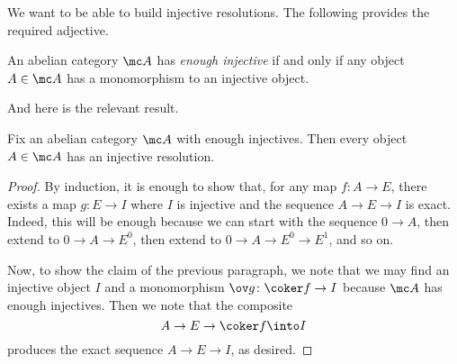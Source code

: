 \documentclass[../notes.tex]{subfiles}
\begin{document}
We want to be able to build injective resolutions. The following provides the required adjective.
\begin{definition}
	An abelian category $\mc A$ has \textit{enough injective} if and only if any object $A\in\mc A$ has a monomorphism to an injective object.
\end{definition}
And here is the relevant result.
\begin{proposition}
	Fix an abelian category $\mc A$ with enough injectives. Then every object $A\in\mc A$ has an injective resolution.
\end{proposition}
\begin{proof}
	By induction, it is enough to show that, for any map $f\colon A\to E$, there exists a map $g\colon E\to I$ where $I$ is injective and the sequence $A\to E\to I$ is exact. Indeed, this will be enough because we can start with the sequence $0\to A$, then extend to $0\to A\to E^0$, then extend to $0\to A\to E^0\to E^1$, and so on.

	Now, to show the claim of the previous paragraph, we note that we may find an injective object $I$ and a monomorphism $\ov g\colon\coker f\to I$ because $\mc A$ has enough injectives. Then we note that the composite
	\[A\to E\to\coker f\into I\]
	produces the exact sequence $A\to E\to I$, as desired.
\end{proof}
\end{document}

